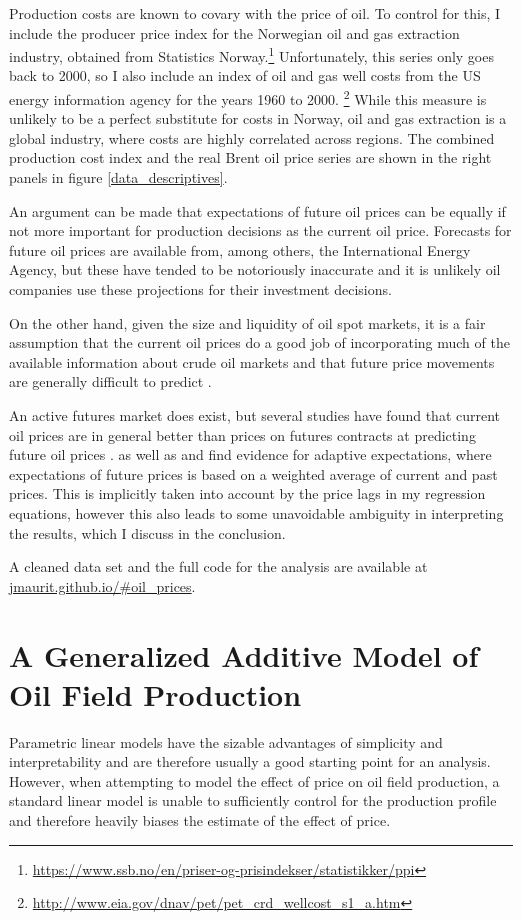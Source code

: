 \documentclass[12pt]{article}
\begin{document}
Production costs are known to covary with the price of oil.  To control for this, I include the producer price index for the Norwegian oil and gas extraction industry, obtained from Statistics Norway.\footnote{\url{https://www.ssb.no/en/priser-og-prisindekser/statistikker/ppi}} Unfortunately, this series only goes back to 2000, so I also include an index of oil and gas well costs from the US energy information agency for the years 1960 to 2000. \footnote{\url{http://www.eia.gov/dnav/pet/pet_crd_wellcost_s1_a.htm}} While this measure is unlikely to be a perfect substitute for costs in Norway, oil and gas extraction is a global industry, where costs are highly correlated across regions. The combined production cost index and the real Brent oil price series are shown in the right panels in figure \ref{data_descriptives}.

An argument can be made that expectations of future oil prices can be equally if not more important for production decisions as the current oil price.  Forecasts for future oil prices are available from, among others, the International Energy Agency, but these have tended to be notoriously inaccurate and it is unlikely oil companies use these projections for their investment decisions.

On the other hand, given the size and liquidity of oil spot markets, it is a fair assumption that the current oil prices do a good job of incorporating much of the available information about crude oil markets and that future price movements are generally difficult to predict \citep{hamilton_understanding_2008}.

An active futures market does exist, but several studies have found that current oil prices are in general better than prices on futures contracts at predicting future oil prices \citep{alquist_what_2010, chinn_predictive_2005}.  \citet{mohn_investment_2008} as well as \citet{pesaran_econometric_1990} and \citet{farzin_impact_2001} find evidence for adaptive expectations, where expectations of future prices is based on a weighted average of current and past prices. This is implicitly taken into account by the price lags in my regression equations, however this also leads to some unavoidable ambiguity in interpreting the results, which I discuss in the conclusion. 

A cleaned data set and the full code for the analysis are available at \url{jmaurit.github.io/#oil_prices}.

\section{A Generalized Additive Model of Oil Field Production}
Parametric linear models have the sizable advantages of simplicity and interpretability and are therefore usually a good starting point for an analysis. However, when attempting to model the effect of price on oil field production, a standard linear model is unable to sufficiently control for the production profile and therefore heavily biases the estimate of the effect of price.
  
\end{document}
